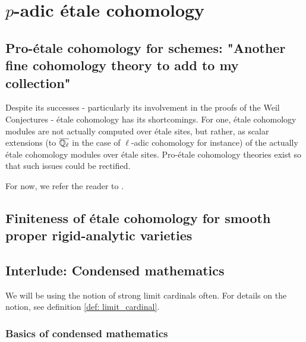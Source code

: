 \chapter{\texorpdfstring{$p$}{}-adic \'etale cohomology}
    \begin{abstract}
        
    \end{abstract}
    
    \minitoc
    
    \section{Pro-\'etale cohomology for schemes: "Another fine cohomology theory to add to my collection"}
        Despite its successes - particularly its involvement in the proofs of the Weil Conjectures - \'etale cohomology has its shortcomings. For one, \'etale cohomology modules are not actually computed over \'etale sites, but rather, as scalar extensions (to $\overline{\mathbb{Q}_{\ell}}$ in the case of $\ell$-adic cohomology for instance) of the actually \'etale cohomology modules over \'etale sites. Pro-\'etale cohomology theories exist so that such issues could be rectified. 
        
        \begin{remark}
            For now, we refer the reader to \cite[Definition 4.1.1 and Remark 4.1.3]{bhatt_scholze_2014_pro_etale}.
        \end{remark}
        
    \section{Finiteness of \'etale cohomology for smooth proper rigid-analytic varieties}
    
    \section{Interlude: Condensed mathematics} \label{section: condensed_mathematics}
        \begin{remark}
            We will be using the notion of strong limit cardinals often. For details on the notion, see definition \ref{def: limit_cardinal}.
        \end{remark}
    
        \subsection{Basics of condensed mathematics}
